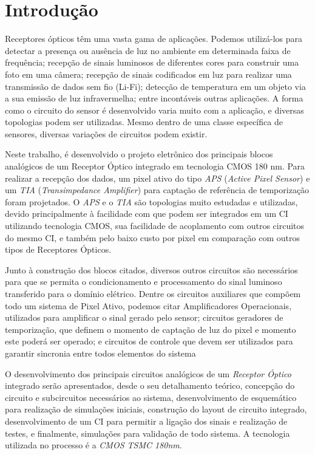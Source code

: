 \chapter[Introdução]{Introdução}
Receptores ópticos têm uma vasta gama de aplicações. Podemos utilizá-los para detectar a presença ou ausência de luz no ambiente em determinada faixa de frequência; recepção de sinais luminosos de diferentes cores para construir uma foto em uma câmera; recepção de sinais codificados em luz para realizar uma transmissão de dados sem fio (Li-Fi); detecção de temperatura em um objeto via a sua emissão de luz infravermelha; entre incontáveis outras aplicações. A forma como o circuito do sensor é desenvolvido varia muito com a aplicação, e diversas topologias podem ser utilizadas. Mesmo dentro de uma classe específica de sensores, diversas variações de circuitos podem existir.

Neste trabalho, é desenvolvido o projeto eletrônico dos principais blocos analógicos de um Receptor \'Optico integrado em tecnologia CMOS 180 nm. Para realizar a recep{\c c}\~ao dos dados, um pixel ativo do tipo \emph{APS} (\emph{Active Pixel Sensor}) e um \emph{TIA} (\emph{Transimpedance Amplifier}) para capta{\c c}\~ao de refer\^encia de temporiza{\c c}\~ao foram projetados. O \emph{APS} e o \emph{TIA} são topologias muito estudadas e utilizadas, devido principalmente à facilidade com que podem ser integrados em um CI utilizando tecnologia CMOS, sua facilidade de acoplamento com outros circuitos do mesmo CI, e também pelo baixo custo por pixel em comparação com outros tipos de Receptores Ópticos. 

Junto à construção dos blocos citados, diversos outros circuitos são necessários para que se permita o condicionamento e processamento do sinal luminoso transferido para o domínio elétrico. Dentre os circuitos auxiliares que compõem todo um sistema de Pixel Ativo, podemos citar Amplificadores Operacionais, utilizados para amplificar o sinal gerado pelo sensor; circuitos geradores de temporização, que definem o momento de captação de luz do pixel e momento este poderá ser operado; e circuitos de controle que devem ser utilizados para garantir sincronia entre todos elementos do sistema

O desenvolvimento dos principais circuitos analógicos de um \emph{Receptor Óptico} integrado serão apresentados, desde o seu detalhamento teórico, concepção do circuito e subcircuitos necessários ao sistema, desenvolvimento de esquemático para realização de simulações iniciais, construção do layout de circuito integrado, desenvolvimento de um CI para permitir a ligação dos sinais e realização de testes, e finalmente, simula{\c c}\~oes para valida{\c c}\~ao de todo sistema. A tecnologia utilizada no processo é a \emph{CMOS TSMC 180nm}.

